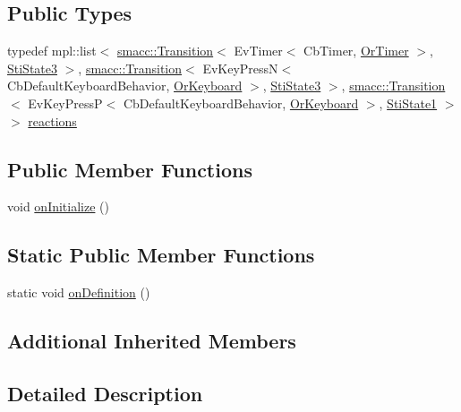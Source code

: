 \subsection*{Public Types}
\begin{DoxyCompactItemize}
\item 
typedef mpl\+::list$<$ \hyperlink{classsmacc_1_1Transition}{smacc\+::\+Transition}$<$ Ev\+Timer$<$ Cb\+Timer, \hyperlink{classsm__three__some_1_1OrTimer}{Or\+Timer} $>$, \hyperlink{structsm__three__some_1_1ss1__states_1_1StiState3}{Sti\+State3} $>$, \hyperlink{classsmacc_1_1Transition}{smacc\+::\+Transition}$<$ Ev\+Key\+PressN$<$ Cb\+Default\+Keyboard\+Behavior, \hyperlink{classsm__three__some_1_1OrKeyboard}{Or\+Keyboard} $>$, \hyperlink{structsm__three__some_1_1ss1__states_1_1StiState3}{Sti\+State3} $>$, \hyperlink{classsmacc_1_1Transition}{smacc\+::\+Transition}$<$ Ev\+Key\+PressP$<$ Cb\+Default\+Keyboard\+Behavior, \hyperlink{classsm__three__some_1_1OrKeyboard}{Or\+Keyboard} $>$, \hyperlink{structsm__three__some_1_1ss1__states_1_1StiState1}{Sti\+State1} $>$ $>$ \hyperlink{structsm__three__some_1_1ss1__states_1_1StiState2_a76dbfd210e719561071e5ad2be819906}{reactions}
\end{DoxyCompactItemize}
\subsection*{Public Member Functions}
\begin{DoxyCompactItemize}
\item 
void \hyperlink{structsm__three__some_1_1ss1__states_1_1StiState2_a0d768a8c4a77afef4b077583fbb1405b}{on\+Initialize} ()
\end{DoxyCompactItemize}
\subsection*{Static Public Member Functions}
\begin{DoxyCompactItemize}
\item 
static void \hyperlink{structsm__three__some_1_1ss1__states_1_1StiState2_a3c8404e63c0b42765b802f5d199abe9b}{on\+Definition} ()
\end{DoxyCompactItemize}
\subsection*{Additional Inherited Members}


\subsection{Detailed Description}


